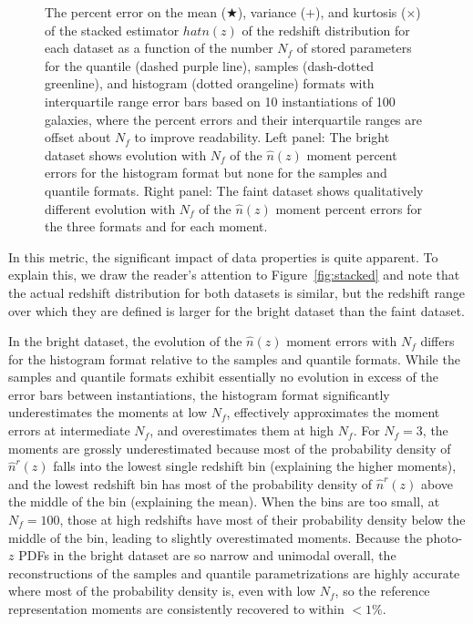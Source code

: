 \documentclass[\docopts]{\docclass}
\newcommand{\pz}{photo-$z$ PDF}
\newcommand{\mgdata}{bright\xspace}
\newcommand{\ssdata}{faint\xspace}
\begin{document}
\begin{figure}
\begin{center}
    \caption{
    The percent error on the mean ($\bigstar$), variance ($+$), and kurtosis 
($\times$) of the stacked estimator $hat{n}(z)$ of the redshift distribution 
for each dataset as a function of the number $N_{f}$ of stored parameters for 
the quantile (dashed purple line), samples (dash-dotted greenline), and 
histogram (dotted orangeline) formats with interquartile range error bars based 
on 10 instantiations of 100 galaxies, where the percent errors and their 
interquartile ranges are offset about $N_{f}$ to improve readability.
    Left panel: The \mgdata dataset shows evolution with $N_{f}$ of the 
$\hat{n}(z)$ moment percent errors for the histogram format but none for the 
samples and quantile formats.
    Right panel: The \ssdata dataset shows qualitatively different evolution 
with $N_{f}$ of the $\hat{n}(z)$ moment percent errors for the three formats 
and for each moment.
    \label{fig:nz_moment_errs}}
  \end{center}
\end{figure}
In this metric, the significant impact of data properties is quite apparent.
To explain this, we draw the reader's attention to Figure~\ref{fig:stacked} and 
note that the actual redshift distribution for both datasets is similar, but 
the redshift range over which they are defined is larger for the \mgdata 
dataset than the \ssdata dataset.

In the \mgdata dataset, the evolution of the $\hat{n}(z)$ moment errors with 
$N_{f}$ differs for the histogram format relative to the samples and quantile 
formats.
While the samples and quantile formats exhibit essentially no evolution in 
excess of the error bars between instantiations, the histogram format 
significantly underestimates the moments at low $N_{f}$, effectively 
approximates the moment errors at intermediate $N_{f}$, and overestimates them 
at high $N_{f}$.
For $N_{f}=3$, the moments are grossly underestimated because most of the 
probability density of $\hat{n}^{r}(z)$ falls into the lowest single redshift 
bin (explaining the higher moments), and the lowest redshift bin has most of 
the probability density of $\hat{n}^{r}(z)$ above the middle of the bin 
(explaining the mean).
When the bins are too small, at $N_{f}=100$, those at high redshifts have most 
of their probability density below the middle of the bin, leading to slightly 
overestimated moments.
Because the \pz s in the \mgdata dataset are so narrow and unimodal overall, 
the reconstructions of the samples and quantile parametrizations are highly 
accurate where most of the probability density is, even with low $N_{f}$, so 
the reference representation moments are consistently recovered to within 
$<1\%$.
\end{document}
